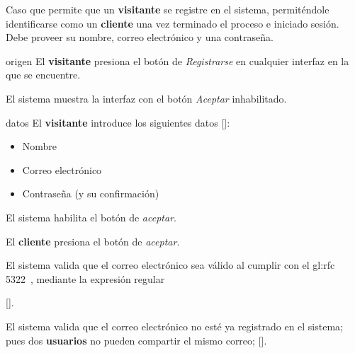 %
%

{
  Caso que permite que un \textbf{visitante} se registre en el sistema,
  permiténdole identificarse como un \textbf{cliente} una vez terminado el
  proceso e iniciado sesión. Debe proveer su nombre, correo electrónico y
  una contraseña.

  \begin{trayectoriaPrincipal}

    \item[origen] El \textbf{visitante} presiona el botón de
      \textit{Registrarse} en cualquier interfaz en la que se
      encuentre.

    \item El sistema muestra la interfaz 
      con el botón \textit{Aceptar} inhabilitado.

    \item[datos] El \textbf{visitante} introduce los siguientes datos
      []:
      \begin{itemize}
        \item Nombre
        \item Correo electrónico
        \item Contraseña (y su confirmación)
      \end{itemize}

    \item El sistema habilita el botón de \textit{aceptar}.

    \item El \textbf{cliente} presiona el botón de \textit{aceptar}.

    \item El sistema valida que el correo electrónico sea válido
      al cumplir con el \gls{gl:rfc}
      5322~\cite{DBLP:journals/rfc/rfc5322}, mediante la expresión
      regular


      [].

    \item El sistema valida que el correo electrónico no esté ya
      registrado en el sistema; pues dos \textbf{usuarios} no pueden
      compartir el mismo correo;
      [].



\end{trayectoriaPrincipal}}
